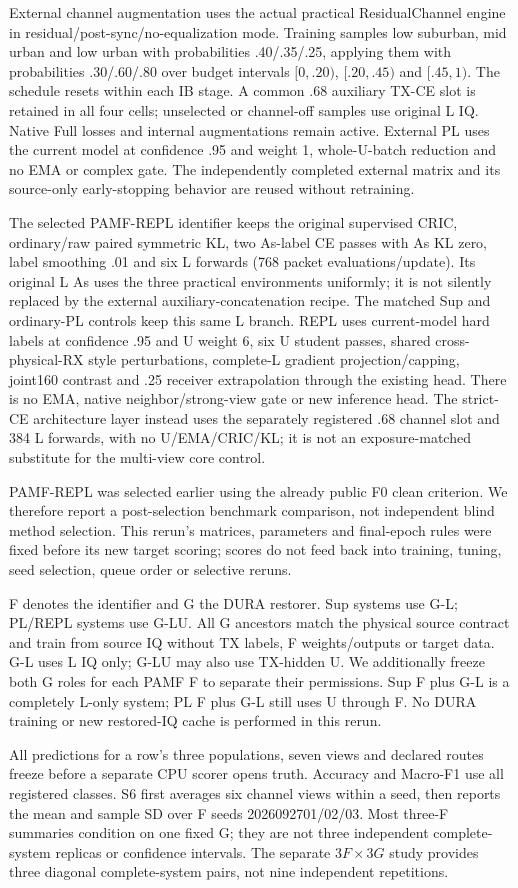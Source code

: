 External channel augmentation uses the actual practical ResidualChannel engine in residual/post-sync/no-equalization mode. Training samples low suburban, mid urban and low urban with probabilities .40/.35/.25, applying them with probabilities .30/.60/.80 over budget intervals $[0,.20)$, $[.20,.45)$ and $[.45,1)$. The schedule resets within each IB stage. A common .68 auxiliary TX-CE slot is retained in all four cells; unselected or channel-off samples use original L IQ. Native Full losses and internal augmentations remain active. External PL uses the current model at confidence .95 and weight 1, whole-U-batch reduction and no EMA or complex gate. The independently completed external matrix and its source-only early-stopping behavior are reused without retraining.

The selected PAMF-REPL identifier keeps the original supervised CRIC, ordinary/raw paired symmetric KL, two As-label CE passes with As KL zero, label smoothing .01 and six L forwards (768 packet evaluations/update). Its original L As uses the three practical environments uniformly; it is not silently replaced by the external auxiliary-concatenation recipe. The matched Sup and ordinary-PL controls keep this same L branch. REPL uses current-model hard labels at confidence .95 and U weight 6, six U student passes, shared cross-physical-RX style perturbations, complete-L gradient projection/capping, joint160 contrast and .25 receiver extrapolation through the existing head. There is no EMA, native neighbor/strong-view gate or new inference head. The strict-CE architecture layer instead uses the separately registered .68 channel slot and 384 L forwards, with no U/EMA/CRIC/KL; it is not an exposure-matched substitute for the multi-view core control.

PAMF-REPL was selected earlier using the already public F0 clean criterion. We therefore report a post-selection benchmark comparison, not independent blind method selection. This rerun's matrices, parameters and final-epoch rules were fixed before its new target scoring; scores do not feed back into training, tuning, seed selection, queue order or selective reruns.

F denotes the identifier and G the DURA restorer. Sup systems use G-L; PL/REPL systems use G-LU. All G ancestors match the physical source contract and train from source IQ without TX labels, F weights/outputs or target data. G-L uses L IQ only; G-LU may also use TX-hidden U. We additionally freeze both G roles for each PAMF F to separate their permissions. Sup F plus G-L is a completely L-only system; PL F plus G-L still uses U through F. No DURA training or new restored-IQ cache is performed in this rerun.

All predictions for a row's three populations, seven views and declared routes freeze before a separate CPU scorer opens truth. Accuracy and Macro-F1 use all registered classes. S6 first averages six channel views within a seed, then reports the mean and sample SD over F seeds 2026092701/02/03. Most three-F summaries condition on one fixed G; they are not three independent complete-system replicas or confidence intervals. The separate $3F\times3G$ study provides three diagonal complete-system pairs, not nine independent repetitions.


